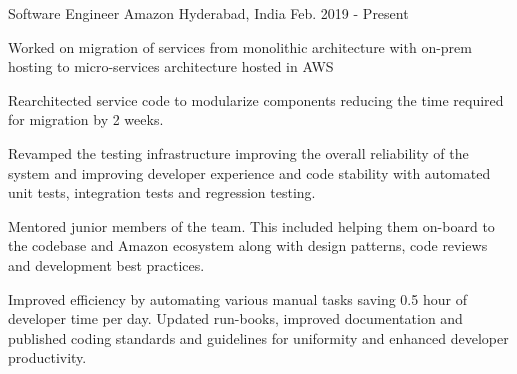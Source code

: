 

\begin{cventries}


    \cventry
    {Software Engineer} %
    {Amazon} %
    {Hyderabad, India} %
    {Feb. 2019 - Present} %
    { \begin{cvitems} %
            \item{Worked on migration of services from monolithic architecture with on-prem hosting to micro-services architecture hosted in AWS} %
            \item {Rearchitected  service code to modularize components reducing the time required for migration by 2 weeks.}
            \item {Revamped the testing infrastructure improving the overall reliability of the system and improving developer experience and code stability with automated unit tests, integration tests and regression testing.}  %
            \item {Mentored junior members of the team. This included helping them on-board to the codebase and Amazon ecosystem along with design patterns, code reviews and development best practices.}    
            \item {Improved efficiency by automating various manual tasks saving 0.5 hour of developer time per day. Updated run-books, improved documentation and published coding standards and guidelines for uniformity and enhanced developer productivity.}  %
        \end{cvitems}
    }




\end{cventries}

